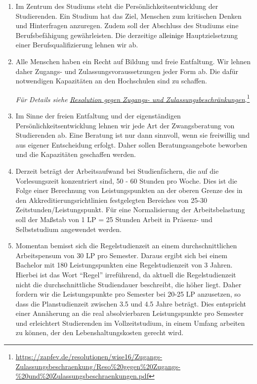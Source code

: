 \documentclass[DIV=calc]{scrartcl}
\newcommand{\okay}[1]{
    \textcolor{black}{#1}
}
\begin{document}
\begin{enumerate}
\def\labelenumi{\arabic{enumi})}

\item Im Zentrum des Studiums steht die Persönlichkeitsentwicklung der Studierenden. Ein Studium hat das Ziel, Menschen zum kritischen Denken und Hinterfragen anzuregen. Zudem soll der Abschluss des Studiums eine Berufsbefähigung gewährleisten. Die derzeitige \okay{alleinige} Hauptzielsetzung einer Berufsqualifizierung lehnen wir ab.

\item Alle Menschen haben ein Recht auf Bildung und freie Entfaltung. Wir lehnen daher Zugangs- und Zulassungsvoraussetzungen jeder Form ab. Die dafür notwendigen Kapazitäten an den Hochschulen sind zu schaffen.

 \emph{Für Details siehe
 }\href{https://zapfev.de/resolutionen/wise16/Zugangs-Zulassungsbeschraenkung/Reso\%20gegen\%20Zugangs-\%20und\%20Zulassungsbeschraenkungen.pdf}{\emph{Resolution
     gegen Zugangs- und Zulassungsbeschränkungen}}.\footnote{\url{https://zapfev.de/resolutionen/wise16/Zugangs-Zulassungsbeschraenkung/Reso\%20gegen\%20Zugangs-\%20und\%20Zulassungsbeschraenkungen.pdf}}
  
\item Im Sinne der freien Entfaltung und der eigenständigen Persönlichkeitsentwicklung lehnen wir jede Art der Zwangsberatung von Studierenden ab. Eine Beratung ist nur dann sinnvoll, wenn sie freiwillig und aus eigener Entscheidung erfolgt. Daher sollen Beratungsangebote beworben
  und die Kapazitäten geschaffen werden.

\item Derzeit beträgt der Arbeitsaufwand%
  bei Studienfächern, die auf die Vorlesungszeit konzentriert sind, 50 - 60 Stunden pro Woche. Dies ist die Folge einer Berechnung von Leistungspunkten an der oberen Grenze des in den Akkreditierungsrichtlinien festgelegten Bereiches von 25-30 Zeitstunden/Leistungspunkt. Für eine Normalisierung der Arbeitsbelastung soll der Maßstab von 1 LP = 25 Stunden Arbeit in Präsenz- und Selbststudium angewendet werden.

\item Momentan bemisst sich die Regelstudienzeit an einem durchschnittlichen Arbeitspensum von 30 LP pro Semester. Daraus ergibt sich bei einem Bachelor mit 180 Leistungspunkten eine Regelstudienzeit von 3 Jahren. Hierbei ist das Wort \enquote{Regel} irreführend, da aktuell die Regelstudienzeit nicht die durchschnittliche Studiendauer beschreibt, die höher liegt. Daher fordern wir die Leistungspunkte pro Semester bei 20-25 LP anzusetzen, so dass die Planstudienzeit zwischen 3.5 und 4.5 Jahre beträgt. Dies entspricht einer Annäherung an die real absolvierbaren Leistungspunkte pro Semester und erleichtert Studierenden im Vollzeitstudium, in einem Umfang arbeiten zu können, der den Lebenshaltungskosten gerecht wird.


\end{enumerate}
\end{document}
